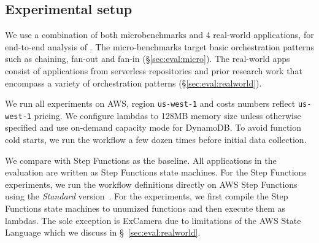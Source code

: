	
	

\subsection{Experimental setup}

We use a combination of both microbenchmarks and 4 real-world applications,
for end-to-end analysis of \name{}. The micro-benchmarks target basic
orchestration patterns such as chaining, fan-out and fan-in
(\S\ref{sec:eval:micro}). The real-world apps consist of applications from
serverless repositories and prior research work  that encompass a variety of
orchestration patterns (\S\ref{sec:eval:realworld}).

We run all experiments on AWS, region \texttt{us-west-1} and costs numbers
reflect \texttt{us-west-1} pricing. We configure lambdas to 128MB memory size
unless otherwise specified and use on-demand capacity mode for DynamoDB. To
avoid function cold starts, we run the workflow a few dozen times before
initial data collection.


We compare with Step Functions as the baseline. All applications in the
evaluation are written as Step Functions state machines. For the Step
Functions experiments, we run the workflow definitions directly on AWS Step
Functions using the \emph{Standard}
version~\cite{aws-step-functions-standard-vs-express}. For the \name{}
experiments, we first compile the Step Functions state machines to unumized
functions and then execute them as lambdas. The sole exception is ExCamera due
to limitations of the AWS State Language which we discuss in
\S~\ref{sec:eval:realworld}.


